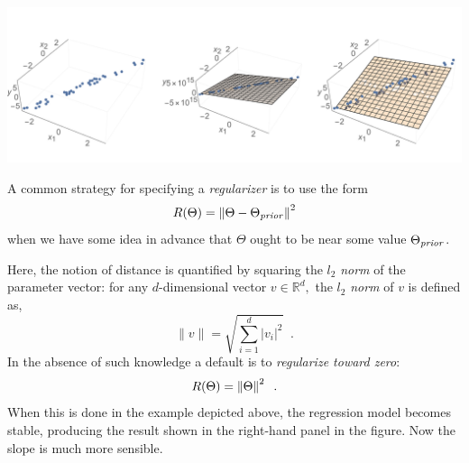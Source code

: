 \includegraphics[width=1.12\textwidth]{figures/regression_ex2_plane1.png}

%
%
%

A common strategy for specifying a \emph{regularizer} is to use the form
\[ R(\Theta) = \left\lVert\Theta - \Theta_{\it prior}\right\rVert^2 \]
when we have some idea in advance that $\Theta$ ought to be near some
value $\Theta_{\it prior}$.%

Here, the notion of distance is quantified by squaring the $l_2$ \textit{norm} of
the parameter vector: for any $d$-dimensional vector $v \in \mathbb{R}^d,$ the $l_2$ \textit{norm} of $v$ is defined as,
\[\|v\| = \sqrt{\sum_{i=1}^d |v_i|^2}\;\;. \]
In the absence of such knowledge a default is
to {\em regularize toward zero}:
\[ R(\Theta) = \left\lVert\Theta\right\rVert^2\;\;. \]
%
When this is done in the example depicted above, the regression model
becomes stable, producing the result shown in the right-hand panel in
the figure.  Now the slope is much more sensible.


